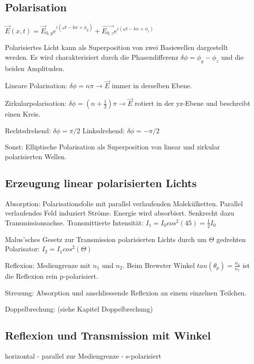 \documentclass[10pt,a4paper]{scrartcl}
\begin{document}
\begin{multicols*}{3}
	\subsection{Polarisation}
	
	$\vec{E}(x,t) = \vec{E}_{0,y}e^{i(\omega t-kx+\phi_y)}+\vec{E_{0,z}}e^{i(\omega t-kx+\phi_z)}$
	
	Polarisiertes Licht kann als Superposition von zwei Basiswellen dargestellt werden. Es wird charakterisiert durch die Phasendifferenz $\delta\phi = \phi_y - \phi_z$ und die beiden Amplituden.
	
	Lineare Polarisation: $\delta\phi = n\pi \rightarrow \vec{E}$ immer in derselben Ebene.
	
	Zirkularpolarisation: $\delta\phi = (n+\frac{1}{2})\pi \rightarrow \vec{E}$ rotiert in der yz-Ebene und beschreibt einen Kreis.
	
	Rechtsdrehend: $\delta\phi = \pi/2$ \hfill Linksdrehend: $\delta\phi = -\pi/2$
	
	Sonst: Elliptische Polarisation als Superposition von linear und zirkular polarisierten Wellen.
	
	\subsection{Erzeugung linear polarisierten Lichts}
	Absorption: Polarisationsfolie mit parallel verlaufenden Molekülketten. Parallel verlaufendes Feld induziert Ströme. Energie wird absorbiert. Senkrecht dazu Transmissionsachse. Transmittierte Intensität: $I_1=I_0cos^2(45)=\frac{1}{2}I_0$

	Malus'sches Gesetz zur Transmission polarisierten Lichts durch um $\Theta$ gedrehten Polarisator: $I_2 = I_1cos^2(\Theta)$
		
	Reflexion: Mediengrenze mit $n_1$ und $n_2$. Beim Brewster Winkel $tan(\theta_p)=\frac{n_2}{n_1}$ ist die Reflexion rein p-polarisiert.
		
	
	Streuung: Absorption und anschliessende Reflexion an einem einzelnen Teilchen.
	
	Doppelbrechung: (siehe Kapitel Doppelbrechung)
	
	\subsection{Reflexion und Transmission mit Winkel}
	
	horizontal - parallel zur Mediengrenze - s-polarisiert


\end{multicols*}
\end{document}
